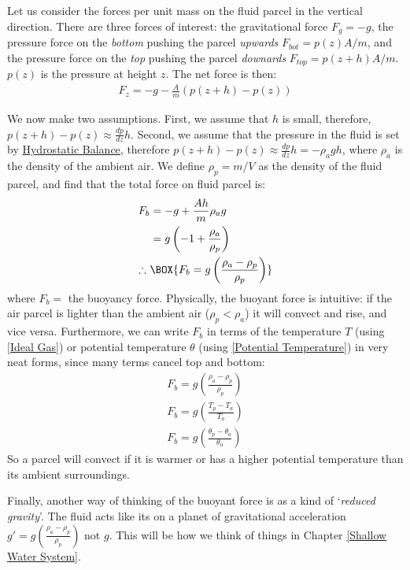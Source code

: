 Let us consider the forces per unit mass on the fluid parcel in the vertical direction. There are three forces of interest: the gravitational force $F_g=-g$, the pressure force on the \textit{bottom} pushing the parcel \textit{upwards} $F_{bot}=p(z)A/m$, and the pressure force on the \textit{top} pushing the parcel \textit{downards} $F_{top}=p(z+h)A/m$. $p(z)$ is the pressure at height $z$. The net force is then:
\begin{align*}
    F_z=-g-\frac{A}{m}(p(z+h)-p(z))
\end{align*}

We now make two assumptions. First, we assume that $h$ is small, therefore, $p(z+h)-p(z)\approx \frac{dp}{dz} h$. Second, we assume that the pressure in the fluid is set by \hyperref[Hydrostatic Balance]{Hydrostatic Balance}, therefore $p(z+h)-p(z)\approx \frac{dp}{dz} h=-\rho_a g h$, where $\rho_a$ is the density of the ambient air. We define $\rho_p=m/V$ as the density of the fluid parcel, and find that the total force on fluid parcel  is:
\begin{align}
    F_b&=-g+\frac{Ah}{m}\rho_a g\nonumber\\
    &=g\left( -1+ \frac{\rho_a}{\rho_p}\right)\nonumber\\
    \label{Buoyancy Force}
    \therefore \,\,& \BOX{F_b=g\left( \frac{\rho_a-\rho_p}{\rho_p} \right)}
\end{align}
where $F_b=$ the buoyancy force. Physically, the buoyant force is intuitive: if the air parcel is lighter than the ambient air ($\rho_p<\rho_a$) it will convect and rise, and vice versa. Furthermore, we can write $F_b$ in terms of the temperature $T$ (using \ref{Ideal Gas}) or potential temperature $\theta$ (using \ref{Potential Temperature}) in very neat forms, since many terms cancel top and bottom:
\begin{align}
    F_b=g\left( \frac{\rho_a-\rho_p}{\rho_p} \right)\nonumber\\
    \label{Buoyancy Force Temp}
    \boxed{F_b=g\left( \frac{T_p-T_a}{T_a} \right)}\\
    \boxed{F_b=g\left( \frac{\theta_p-\theta_a}{\theta_a} \right)}
\end{align}
So a parcel will convect if it is warmer or has a higher potential temperature than its ambient surroundings.

Finally, another way of thinking of the buoyant force is as a kind of `\textit{reduced gravity}'. The fluid acts like its on a planet of gravitational acceleration $g'=g\left( \frac{\rho_a-\rho_p}{\rho_p} \right)$ not $g$. This will be how we think of things in Chapter \ref{Shallow Water System}. 

